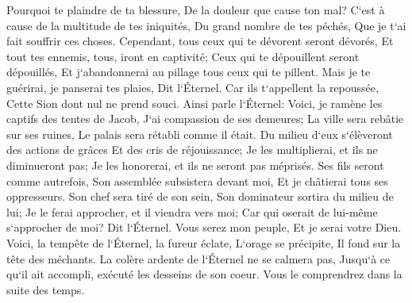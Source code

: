 \verse Pourquoi te plaindre de ta blessure, De la douleur que cause ton mal? C`est à cause de la multitude de tes iniquités, Du grand nombre de tes péchés, Que je t`ai fait souffrir ces choses. 
\verse Cependant, tous ceux qui te dévorent seront dévorés, Et tout tes ennemis, tous, iront en captivité; Ceux qui te dépouillent seront dépouillés, Et j`abandonnerai au pillage tous ceux qui te pillent. 
\verse Mais je te guérirai, je panserai tes plaies, Dit l`Éternel. Car ils t`appellent la repoussée, Cette Sion dont nul ne prend souci. 
\verse Ainsi parle l`Éternel: Voici, je ramène les captifs des tentes de Jacob, J`ai compassion de ses demeures; La ville sera rebâtie sur ses ruines, Le palais sera rétabli comme il était. 
\verse Du milieu d`eux s`élèveront des actions de grâces Et des cris de réjouissance; Je les multiplierai, et ils ne diminueront pas; Je les honorerai, et ils ne seront pas méprisés. 
\verse Ses fils seront comme autrefois, Son assemblée subsistera devant moi, Et je châtierai tous ses oppresseurs. 
\verse Son chef sera tiré de son sein, Son dominateur sortira du milieu de lui; Je le ferai approcher, et il viendra vers moi; Car qui oserait de lui-même s`approcher de moi? Dit l`Éternel. 
\verse Vous serez mon peuple, Et je serai votre Dieu. 
\verse Voici, la tempête de l`Éternel, la fureur éclate, L`orage se précipite, Il fond sur la tête des méchants. 
\verse La colère ardente de l`Éternel ne se calmera pas, Jusqu`à ce qu`il ait accompli, exécuté les desseins de son coeur. Vous le comprendrez dans la suite des temps. 


